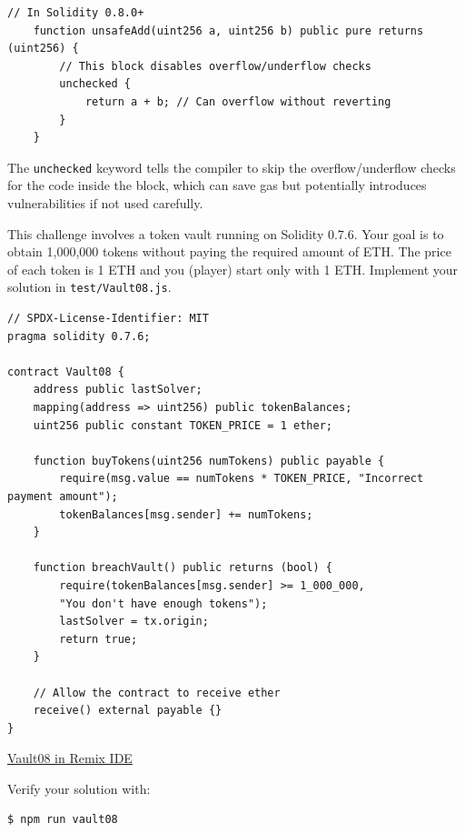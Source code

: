 \documentclass[12pt]{article}
\begin{document}
\begin{lstlisting}[language=Solidity]
    // In Solidity 0.8.0+
    function unsafeAdd(uint256 a, uint256 b) public pure returns (uint256) {
        // This block disables overflow/underflow checks
        unchecked {
            return a + b; // Can overflow without reverting
        }
    }
\end{lstlisting}

\noindent
The \texttt{unchecked} keyword tells the compiler to skip the overflow/underflow checks for the code inside the block, which can save gas but potentially introduces vulnerabilities if not used carefully.

\medskip
\noindent
This challenge involves a token vault running on Solidity 0.7.6. Your goal is to obtain 1,000,000 tokens without paying the required amount of ETH. The price of each token is 1 ETH and you (player) start only with 1 ETH. Implement your solution in \texttt{test/Vault08.js}.

\begin{lstlisting}[language=Solidity]
// SPDX-License-Identifier: MIT
pragma solidity 0.7.6;

contract Vault08 {
    address public lastSolver;
    mapping(address => uint256) public tokenBalances;
    uint256 public constant TOKEN_PRICE = 1 ether;
    
    function buyTokens(uint256 numTokens) public payable {
        require(msg.value == numTokens * TOKEN_PRICE, "Incorrect payment amount");
        tokenBalances[msg.sender] += numTokens;
    }
    
    function breachVault() public returns (bool) {
        require(tokenBalances[msg.sender] >= 1_000_000, 
        "You don't have enough tokens");
        lastSolver = tx.origin;
        return true;
    }
    
    // Allow the contract to receive ether
    receive() external payable {}
}
\end{lstlisting}

\medskip
\noindent
\href{https://remix.ethereum.org/?#activate=solidity&url=https://github.com/radovluk/unbreakable-vault/contracts/Vault08.sol&lang=en&optimize=false&runs=200&evmVersion=null&version=soljson-v0.7.6+commit.7338295f.js}{Vault08 in Remix IDE}

\medskip
\noindent
Verify your solution with:
\begin{verbatim}
$ npm run vault08
\end{verbatim}
\end{document}
